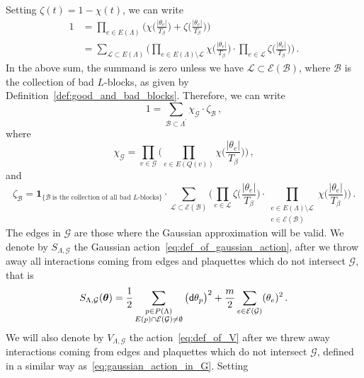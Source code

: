 \documentclass[11pt]{article}
\theoremstyle{definition}
\theoremstyle{remark}
\numberwithin{theorem}{section}
\def\La{{\Lambda}}
\newcommand{\cE}{\mathcal{E}}
\newcommand{\cB}{\mathcal B}
\newcommand{\cG}{\mathcal G}
\begin{document}
    Setting $\zeta(t) = 1- \chi(t)$, we can write 
    \begin{align*}
    \nonumber
        1 &= \prod_{e\in E(\Lambda)} \bigg(\chi\Big(\frac{|\theta_e|}{T_\beta}\Big) + \zeta\Big(\frac{|\theta_e|}{T_\beta}\Big) \bigg) \\ &= \sum_{\mathcal{L} \subset E(\Lambda)} \bigg( \prod_{e\in E(\La)\setminus \mathcal{L} } \chi\Big(\frac{|\theta_e|}{T_\beta}\Big) \cdot  \prod_{e\in \mathcal{L}}\zeta\Big(\frac{|\theta_e|}{T_\beta}\Big)\bigg) \, .
    \end{align*}
    In the above sum, the summand is zero unless we have $\mathcal{L}\subset\cE (\cB)$, where $\cB$ is the collection of bad $L$-blocks, as given by Definition~\ref{def:good_and_bad_blocks}. Therefore, we can write 
    \begin{equation}   \label{eq:partition_of_unity_into_large_and_small_fields}
        1  = \sum_{\cB\subset \La^\prime} \chi_{\cG} \cdot \zeta_{\cB} \, , 
    \end{equation}
    where
    \begin{equation} \label{eq:def_of_chi_G}
        \chi_{\cG} = \prod_{v\in \cG} \Big( \prod_{e\in E(Q(v))} \chi\Big(\frac{|\theta_e|}{T_\beta}\Big) \Big) \, ,
    \end{equation}
    and
    \begin{equation} \label{eq:def_of_zeta_B}
        \zeta_{\cB} = \mathbf{1}_{\{\cB \ \text{is the collection of all bad $L$-blocks}\}} \cdot \sum_{\mathcal{L} \subset \cE(\cB)} \bigg(\prod_{e\in \mathcal{L}} \zeta\Big(\frac{|\theta_e|}{T_\beta}\Big) \cdot \prod_{\substack{e\in E(\La) \setminus \mathcal{L} \\ e \in \cE(\cB) }} \chi\Big(\frac{|\theta_e|}{T_\beta}\Big)\bigg)  \, .
    \end{equation}
    The edges in $\mathcal{G}$ are those where the Gaussian approximation will be valid. We denote by $S_{\Lambda,\mathcal{G}}$ the Gaussian action~\eqref{eq:def_of_gaussian_action}, after we throw away all interactions coming from edges and plaquettes which do not intersect $\mathcal{G}$, that is 
    \begin{equation}
        \label{eq:gaussian_action_in_G}
        S_{\Lambda,\mathcal{G}}(\boldsymbol{\theta}) = \frac{1}{2} \sum_{\substack{p\in P(\Lambda) \\ E(p)\cap \cE (\mathcal{G}) \not= \emptyset}}  \big({\sf d}\theta_p\big)^2 + \frac{m}{2}\sum_{e\in \cE (\mathcal{G})} (\theta_e)^2 \, . 
    \end{equation}
    We will also denote by $V_{\Lambda,\mathcal{G}}$ the action~\eqref{eq:def_of_V} after we threw away interactions coming from edges and plaquettes which do not intersect $\mathcal{G}$, defined in a similar way as~\eqref{eq:gaussian_action_in_G}. Setting
\end{document}
